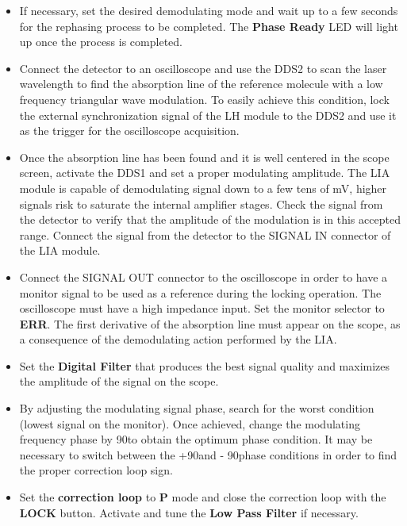 \begin{itemize}
    \item If necessary, set the desired demodulating mode and wait up to a few seconds for the rephasing process to be completed. The \textbf{Phase Ready} LED will light up once the process is completed.
    
    \item Connect the detector to an oscilloscope and use the DDS2 to scan the laser wavelength to find the absorption line of the reference molecule with a low frequency triangular wave modulation. To easily achieve this condition, lock the external synchronization signal of the LH module to the DDS2 and use it as the trigger for the oscilloscope acquisition.
    
    \item Once the absorption line has been found and it is well centered in the scope screen, activate the DDS1 and set a proper modulating amplitude. The LIA module is capable of demodulating signal down to a few tens of mV, higher signals risk to saturate the internal amplifier stages. Check the signal from the detector to verify that the amplitude of the modulation is in this accepted range. Connect the signal from the detector to the SIGNAL IN connector of the LIA module.
    
    \item Connect the SIGNAL OUT connector to the oscilloscope in order to have a monitor signal to be used as a reference during the locking operation. The oscilloscope must have a high impedance input. Set the monitor selector to \textbf{ERR}. The first derivative of the absorption line must appear on the scope, as a consequence of the demodulating action performed by the LIA.

    \item Set the \textbf{Digital Filter} that produces the best signal quality and maximizes the amplitude of the signal on the scope.
    
    \item By adjusting the modulating signal phase, search for the worst condition (lowest signal on the monitor). Once achieved, change the modulating frequency phase by 90\textdegree to obtain the optimum phase condition. It may be necessary to switch between the +90\textdegree and - 90\textdegree phase conditions in order to find the proper correction loop sign.
    
    \item Set the \textbf{correction loop} to \textbf{P} mode and close the correction loop with the \textbf{LOCK} button. Activate and tune the \textbf{Low Pass Filter} if necessary.


\end{itemize}
